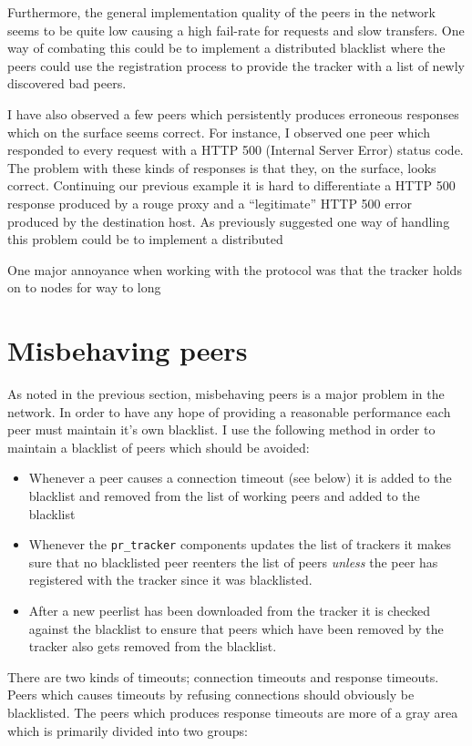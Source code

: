 \documentclass{sig-alternate}
\begin{document}
Furthermore, the general implementation quality of the peers in the
network seems to be quite low causing a high fail-rate for requests
and slow transfers. One way of combating this could be to implement a
distributed blacklist where the peers could use the registration process
to provide the tracker with a list of newly discovered bad peers.

I have also observed a few peers which persistently produces erroneous
responses which on the surface seems correct. For instance, I observed
one peer which responded to every request with a HTTP 500 (Internal
Server Error) status code. The problem with these kinds of responses
is that they, on the surface, looks correct. Continuing our previous
example it is hard to differentiate a HTTP 500 response produced by a
rouge proxy and a ``legitimate'' HTTP 500 error produced by the
destination host. As previously suggested one way of handling this
problem could be to implement a distributed 

One major annoyance when working with the protocol was that the
tracker holds on to nodes for way to long

\section{Misbehaving peers}
As noted in the previous section, misbehaving peers is a major problem
in the network. In order to have any hope of providing a reasonable
performance each peer must maintain it's own blacklist. I use the
following method in order to maintain a blacklist of peers which
should be avoided:

\begin{itemize}
\item Whenever a peer causes a connection timeout (see below) it is
  added to the blacklist and removed from the list of working peers
  and added to the blacklist
\item Whenever the \verb!pr_tracker! components updates the list of
  trackers it makes sure that no blacklisted peer reenters the list of
  peers \textit{unless} the peer has registered with the tracker since
  it was blacklisted.
\item After a new peerlist has been downloaded from the tracker it is
  checked against the blacklist to ensure that peers which have been
  removed by the tracker also gets removed from the blacklist.
\end{itemize}

There are two kinds of timeouts; connection timeouts and response
timeouts. Peers which causes timeouts by refusing connections should
obviously be blacklisted. The peers which produces response timeouts
are more of a gray area which is primarily divided into two groups:
\end{document}
